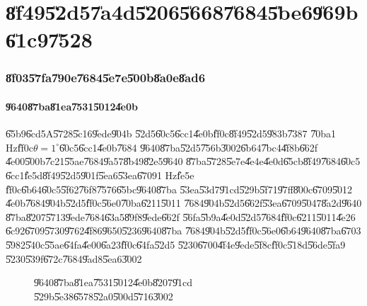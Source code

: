                       

\part{\U{8f49}\U{52d5}\U{7a4d}\U{5206}\U{5668}\U{7684}\U{5be6}\U{969b}%
\U{61c9}\U{7528}}

\section{\U{8f03}\U{57fa}\U{790e}\U{7684}\U{5e7e}\U{500b}\U{8a0e}\U{8ad6}}

\subsection{\U{9640}\U{87ba}\U{81ea}\U{7531}\U{5012}\U{4e0b}}

\setcounter{xpage}{1}\U{65b9}\U{6cd5}A\U{5728}\U{5c16}\U{9ede}\U{904b}%
\U{52d5}\U{60c5}\U{6cc1}\U{4e0b}\U{ff0c}\U{8f49}\U{52d5}\U{983b}\U{7387}%
\U{70ba}1 Hz\U{ff0c}$\theta =1^{\circ }$\U{60c5}\U{6cc1}\U{4e0b}\U{7684}%
\U{9640}\U{87ba}\U{52d5}\U{756b}\U{3002}\U{6b64}\U{7bc4}\U{4f8b}\U{662f}%
\U{4e00}\U{500b}\U{7c21}\U{55ae}\U{7684}\U{9a57}\U{8b49}\U{82e5}\U{9640}%
\U{87ba}\U{5728}\U{5e7e}\U{4e4e}\U{4e0d}\U{65cb}\U{8f49}\U{7684}\U{60c5}%
\U{6cc1}\U{fe5d}\U{8f49}\U{52d5}\U{901f}\U{5ea6}\U{53ea}\U{6709}1 Hz\U{fe5e}%
\U{ff0c}\U{6b64}\U{60c5}\U{5f62}\U{76f8}\U{7576}\U{65bc}\U{9640}\U{87ba}%
\U{53ea}\U{53d7}\U{91cd}\U{529b}\U{5f71}\U{97ff}\U{800c}\U{6709}\U{5012}%
\U{4e0b}\U{7684}\U{904b}\U{52d5}\U{ff0c}\U{56e0}\U{70ba}\U{6211}\U{5011}%
\U{7684}\U{904b}\U{52d5}\U{662f}\U{53ea}\U{6709}\U{5047}\U{8a2d}\U{9640}%
\U{87ba}\U{8207}\U{5713}\U{9ede}\U{7684}\U{63a5}\U{89f8}\U{9ede}\U{662f}%
\U{56fa}\U{5b9a}\U{4e0d}\U{52d5}\U{7684}\U{ff0c}\U{6211}\U{5011}\U{4e26}%
\U{6c92}\U{6709}\U{5730}\U{9762}\U{4f86}\U{9650}\U{5236}\U{9640}\U{87ba}%
\U{7684}\U{904b}\U{52d5}\U{ff0c}\U{56e0}\U{6b64}\U{9640}\U{87ba}\U{6703}%
\U{5982}\U{540c}\U{55ae}\U{64fa}\U{4e00}\U{6a23}\U{ff0c}\U{64fa}\U{52d5}%
\U{5230}\U{6700}\U{4f4e}\U{9ede}\U{5f8c}\U{ff0c}\U{518d}\U{56de}\U{5fa9}%
\U{5230}\U{539f}\U{672c}\U{7684}\U{9ad8}\U{5ea6}\U{3002}

\begin{figure}[th]
\caption{\U{9640}\U{87ba}\U{81ea}\U{7531}\U{5012}\U{4e0b}\U{8207}\U{91cd}%
\U{529b}\U{5e38}\U{6578}\U{52a0}\U{500d}\U{5716}\U{3002}}
\begin{center}
%

\end{center}
\end{figure}

